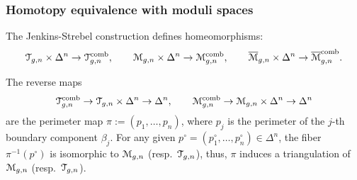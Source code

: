 \subsubsection{Homotopy equivalence with moduli spaces}
\label{sec:homotopy-equiv}
\begin{theorem}
  \label{thm:HMT}
  The Jenkins-Strebel construction defines homeomorphisms:
  \begin{equation*}
    \mathcal{T}_{g,n} \times \Delta^n \to \mathcal{T}\sp{\text{comb}}_{g,n}, 
    \qquad
    \mathcal{M}_{g,n} \times \Delta^n \to \mathcal{M}\sp{\text{comb}}_{g,n}, 
    \qquad 
    \overline{\mathcal{M}}_{g,n} \times \Delta^n \to \overline{\mathcal{M}}\sp{\text{comb}}_{g,n}.
  \end{equation*}
\end{theorem}

The reverse maps
\begin{equation*}
  \mathcal{T}\sp{\text{comb}}_{g,n} \to \mathcal{T}_{g,n} \times \Delta^n \to \Delta^n,
  \qquad
  \mathcal{M}\sp{\text{comb}}_{g,n} \to \mathcal{M}_{g,n} \times \Delta^n \to \Delta^n
\end{equation*}
are the perimeter map $\pi := (p_1, \ldots, p_n)$, where $p_j$ is the
perimeter of the $j$-th boundary component $\beta_j$.  For any given $p^\circ
= (p_1^\circ, \ldots, p_n^\circ) \in \Delta^n$, the fiber $\pi^{-1}(p^\circ)$ is isomorphic
to $\mathcal{M}_{g,n}$ (resp.\ $\mathcal{T}_{g,n}$), thus, $\pi$ induces a triangulation
of $\mathcal{M}_{g,n}$ (resp.\ $\mathcal{T}_{g,n}$).

